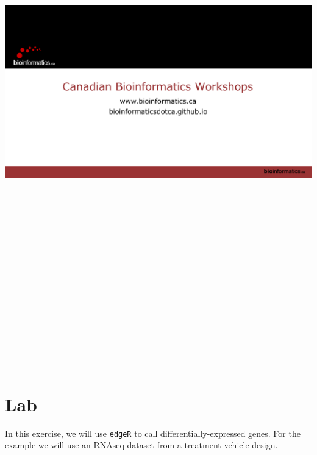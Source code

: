 \documentclass[
]{book}
\begin{document}
\includegraphics[width=1\textwidth,height=9.375in]{content-files/module-4-lecture.pdf}\\

\section{Lab}\label{lab-3}

In this exercise, we will use \texttt{edgeR} to call differentially-expressed genes. For the example we will use an RNAseq dataset from a treatment-vehicle design.
\end{document}
